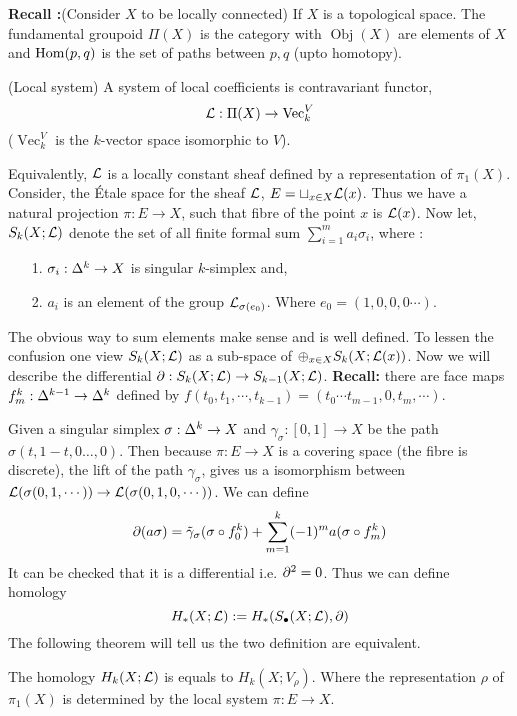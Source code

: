 \documentclass[11pt]{article}
\begin{document}
\textbf{Recall :}(Consider $X$ to be locally connected) If $X$ is a topological space. The fundamental groupoid $\Pi(X)$ is the category with $\operatorname{Obj}(X)$ are elements of $X$ and $\operatorname{Hom}(p,q)$ is the set of paths between $p,q$ (upto homotopy).
\begin{Def}{(Local system) }{}
   A system of local coefficients is contravariant functor, $$\mathcal{L} : \Pi(X) \to \operatorname{Vec}_k^{V}$$
   ($\operatorname{Vec}_k^{V}$ is the $k$-vector space isomorphic to $V$).
\end{Def}
\noindent Equivalently, $\mathcal{L}$ is a locally constant sheaf defined by a representation of $\pi_1(X)$. Consider, the \'Etale space for the sheaf $\mathcal{L}$, $E = \sqcup_{x \in X} \mathcal{L}(x)$. Thus we have a natural projection $\pi : E \to X$, such that fibre of the point $x$ is $\mathcal{L} (x)$. Now let, $S_k(X;\mathcal{L})$ denote the set of all finite formal sum $\sum_{i=1}^m a_i \sigma_i$, where : \begin{itemize}
    \item[1.] $\sigma_i: \Delta^k \to X$ is singular $k$-simplex and,
    \item[2.] $a_i$ is an element of the group $\mathcal{L}_{\sigma(e_0)}$. Where $e_0 =(1,0,0,0\cdots)$. 
\end{itemize} 
The obvious way to sum elements make sense and is well defined. To lessen the confusion one view $S_k(X;\mathcal{L})$ as a sub-space of $\oplus_{x\in X} S_k(X;\mathcal{L}(x))$. Now we will describe the differential $\partial : S_k(X;\mathcal{L}) \to S_{k-1}(X;\mathcal{L})$. \textbf{Recall:} there are face maps $f^k_m:\Delta^{k-1}\to \Delta^k$ defined by $f(t_0,t_1,\cdots,t_{k-1}) = (t_0 \cdots t_{m-1}, 0, t_m ,\cdots)$.

\vspace*{0.2cm}

Given a singular simplex $\sigma : \Delta^k \to X$ and $\gamma_{\sigma}:[0,1]\to X$ be the path $\sigma(t,1-t,0\dots,0)$. Then because $\pi : E \to X$ is a covering space (the fibre is discrete), the lift of the path $\gamma_{\sigma}$, gives us a isomorphism between $\mathcal{L}(\sigma(0,1,\cdots))\to \mathcal{L}(\sigma(0,1,0,\cdots))$. We can define $$\partial(a\sigma) = \tilde{\gamma}_{\sigma}(\sigma \circ f_0^{k}) + \sum_{m=1}^{k} (-1)^m a (\sigma \circ f_m^k)$$ It can be checked that it is a differential i.e. $\partial ^2 =0$. Thus we can define homology $$H_{\ast}(X;\mathcal{L}) := H_{\ast}(S_{\bullet}(X;\mathcal{L}),\partial)$$ The following theorem will tell us the two definition are equivalent. 

\begin{Thm}{}{}
  The homology $H_k(X;\mathcal{L})$ is equals to $H_k(X;V_{\rho})$. Where the representation $\rho$ of $\pi_1(X)$ is determined by the local system $\pi:E\to X$.
\end{Thm}
\end{document}
